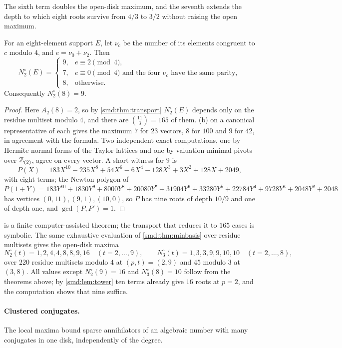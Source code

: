 The sixth term doubles the open-disk maximum, and the seventh extends the depth to which eight
roots survive from $4/3$ to $3/2$ without raising the open maximum.

\begin{theorem}\label{smd:thm:eight}
For an eight-element support $E$, let $\nu_c$ be the number of its elements congruent to $c$
modulo $4$, and $e=\nu_0+\nu_2$. Then
\[
 N^\circ_2(E)=\begin{cases}
 9,&e\equiv2\pmod4,\\
 7,&e\equiv0\pmod4\text{ and the four }\nu_c\text{ have the same parity},\\
 8,&\text{otherwise}.
 \end{cases}
\]
Consequently $N^\circ_2(8)=9$.
\end{theorem}

\begin{proof}
Here $A_2(8)=2$, so by \cref{smd:thm:transport} $N^\circ_2(E)$ depends only on the residue
multiset modulo $4$, and there are $\binom{11}3=165$ of them. (b) on a
canonical representative of each gives the maximum $7$ for $23$ vectors, $8$ for $100$ and $9$
for $42$, in agreement with the formula. Two independent exact computations, one by Hermite normal
forms of the Taylor lattices and one by valuation-minimal pivots over $\mathbb{Z}_{(2)}$, agree on every
vector. A short witness for $9$ is
\[
 P(X)=183X^{10}-235X^8+54X^6-6X^4-128X^3+3X^2+128X+2049 ,
\]
with eight terms; the Newton polygon of
$P(1+Y)=183Y^{10}+1830Y^9+8000Y^8+20080Y^7+31904Y^6+33280Y^5+22784Y^4+9728Y^3+2048Y^2+2048$
has vertices $(0,11),(9,1),(10,0)$, so $P$ has nine roots of depth $10/9$ and one of depth one,
and $\gcd(P,P')=1$.
\end{proof}

 is a finite computer-assisted theorem; the transport that reduces it to $165$
cases is symbolic. The same exhaustive evaluation of \cref{smd:thm:minbasis} over residue
multisets gives the open-disk maxima
\[
 N^\circ_2(t)=1,2,4,4,8,8,9,16\quad(t=2,\dots,9),\qquad N^\circ_3(t)=1,3,3,9,9,10,10\quad(t=2,\dots,8),
\]
over $220$ residue multisets modulo $4$ at $(p,t)=(2,9)$ and $45$ modulo $3$ at $(3,8)$. All values
except $N^\circ_2(9)=16$ and $N^\circ_3(8)=10$ follow from the theorems above; by
\cref{smd:lem:tower} ten terms already give $16$ roots at $p=2$, and the computation shows that nine
suffice.

\paragraph{Clustered conjugates.}
The local maxima bound sparse annihilators of an algebraic number with many conjugates in one
disk, independently of the degree.

